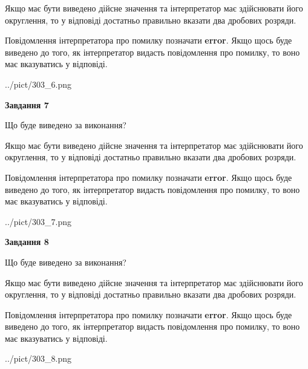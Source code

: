 \documentclass[12pt, ukrainian]{article}
\begin{document}
{\begin {Large}
Якщо має бути виведено дійсне значення та інтерпретатор має здійснювати його округлення, 
то у відповіді достатньо правильно вказати два дробових розряди.

Повідомлення інтерпретатора про помилку позначати \textbf{error}.
Якщо щось буде виведено до того, як інтерпретатор видасть повідомлення про помилку, 
то воно має вказуватись у відповіді. \par

\begin{center}
	{../pict/303_6.png}
\end{center}
\newpage

{\begin {center}\textbf{Завдання 7}\end {center}}\par
Що буде виведено за виконання? \par

Якщо має бути виведено дійсне значення та інтерпретатор має здійснювати його округлення, 
то у відповіді достатньо правильно вказати два дробових розряди.

Повідомлення інтерпретатора про помилку позначати \textbf{error}.
Якщо щось буде виведено до того, як інтерпретатор видасть повідомлення про помилку, 
то воно має вказуватись у відповіді. \par

\begin{center}
	{../pict/303_7.png}
\end{center}
\newpage

{\begin {center}\textbf{Завдання 8}\end {center}}\par
Що буде виведено за виконання? \par

Якщо має бути виведено дійсне значення та інтерпретатор має здійснювати його округлення, 
то у відповіді достатньо правильно вказати два дробових розряди.

Повідомлення інтерпретатора про помилку позначати \textbf{error}.
Якщо щось буде виведено до того, як інтерпретатор видасть повідомлення про помилку, 
то воно має вказуватись у відповіді. \par

\begin{center}
	{../pict/303_8.png}
\end{center}
\newpage


\end{Large}}
\end{document}
